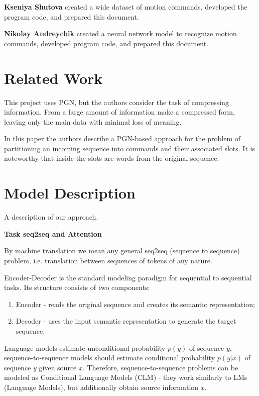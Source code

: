 \documentclass{article}
\begin{document}
\textbf{Kseniya Shutova} created a wide dataset of motion commands, developed the program code, and prepared this document.

\textbf{Nikolay Andreychik} created a neural network model to recognize motion commands, developed program code, and prepared this document.


\section{Related Work}
\label{sec:related}

\par{\cite{article_1} This project uses PGN, but the authors consider the task of compressing information. From a large amount of information make a compressed form, leaving only the main data with minimal loss of meaning.}

\cite{article_2} In this paper the authors describe a PGN-based approach for the problem of partitioning an incoming sequence into commands and their associated slots. It is noteworthy that inside the slots are words from the original sequence.

\section{Model Description}
A description of our approach.

\textbf{Task seq2seq and Attention}

By machine translation we mean any general seq2seq (sequence to sequence) problem, i.e. translation between sequences of tokens of any nature.

Encoder-Decoder is the standard modeling paradigm for sequential to sequential tasks. Its structure consists of two components:

\begin{enumerate}
\item Encoder - reads the original sequence and creates its semantic representation;
\item Decoder - uses the input semantic representation to generate the target sequence.
\end{enumerate}

Language models estimate unconditional probability $p(y)$ of sequence $y$, sequence-to-sequence models should estimate conditional probability $p(y|x)$ of sequence $y$ given source $x$. Therefore, sequence-to-sequence problems can be modeled as Conditional Language Models (CLM) - they work similarly to LMs (Language Models), but additionally obtain source information $x$.
\end{document}
